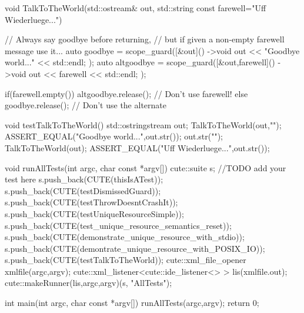\documentclass[ebook,11pt,article]{memoir}
\begin{document}
\begin{codeblock}
{}
void TalkToTheWorld(std::ostream& out, std::string const farewell="Uff Wiederluege...")
{
	// Always say goodbye before returning,
	// but if given a non-empty farewell message use it...
	auto goodbye = scope_guard([&out]() ->void
	{
		out << "Goodbye world..." << std::endl;
	});
	auto altgoodbye = scope_guard([&out,farewell]() ->void
	{
		out << farewell << std::endl;
	});


	if(farewell.empty())
	{
		altgoodbye.release();		// Don't use farewell!
	}
	else
	{
		goodbye.release();	// Don't use the alternate
	}
}

void testTalkToTheWorld(){
	std::ostringstream out;
	TalkToTheWorld(out,"");
	ASSERT_EQUAL("Goodbye world...\n",out.str());
	out.str("");
	TalkToTheWorld(out);
	ASSERT_EQUAL("Uff Wiederluege...\n",out.str());
}

void runAllTests(int argc, char const *argv[]){
	cute::suite s;
	//TODO add your test here
	s.push_back(CUTE(thisIsATest));
	s.push_back(CUTE(testDismissedGuard));
	s.push_back(CUTE(testThrowDoesntCrashIt));
	s.push_back(CUTE(testUniqueResourceSimple));
	s.push_back(CUTE(test_unique_resource_semantics_reset));
	s.push_back(CUTE(demonstrate_unique_resource_with_stdio));
	s.push_back(CUTE(demontrate_unique_resource_with_POSIX_IO));
	s.push_back(CUTE(testTalkToTheWorld));
	cute::xml_file_opener xmlfile(argc,argv);
	cute::xml_listener<cute::ide_listener<> >  lis(xmlfile.out);
	cute::makeRunner(lis,argc,argv)(s, "AllTests");
}

int main(int argc, char const *argv[]){
    runAllTests(argc,argv);
    return 0;
}
\end{codeblock}
\end{document}
